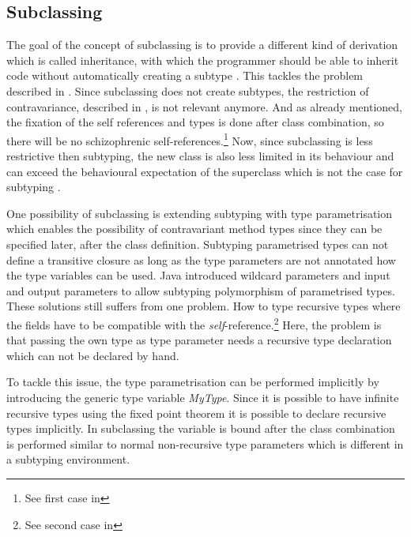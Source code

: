 \subsection{Subclassing}

The goal of the concept of subclassing is to provide a different
kind of derivation which is called inheritance, with which the
programmer should be able to inherit code without automatically creating a
subtype \cite{simons_theory_2002-2}. This tackles the problem described in
. Since subclassing does not create subtypes, the
restriction of contravariance, described in ,
is not relevant anymore. And as already mentioned, the fixation of
the self references and types is done after class combination, so there
will be no schizophrenic self-references.\footnote{See first case in
} Now, since subclassing is less restrictive
then subtyping, the new class is also less limited in its behaviour and
can exceed the behavioural expectation of the superclass which is not
the case for subtyping \cite{simons_theory_2002-2}.

One possibility of subclassing is extending subtyping with type
parametrisation which enables the possibility of contravariant
method types since they can be specified later, after the class
definition. Subtyping parametrised types can not define a transitive
closure as long as the type parameters are not annotated how the
type variables can be used. Java introduced wildcard parameters and
\cs input and output parameters to allow subtyping polymorphism
of parametrised types. These solutions still suffers from one
problem. How to type recursive types where the fields have to be
compatible with the \emph{self}-reference.\footnote{See second case in
} Here, the problem is that passing the own
type as type parameter needs a recursive type declaration which can not
be declared by hand.

To tackle this issue, the type parametrisation can be performed implicitly
by introducing the generic type variable \emph{MyType}. Since it is
possible to have infinite recursive types using the fixed point theorem
\cite{pierce_types_2002} it is possible to declare recursive types
implicitly. In subclassing the \mytype variable is bound after the
class combination is performed similar to normal non-recursive type
parameters which is different in a subtyping environment.

